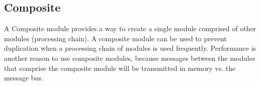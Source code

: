 \par
\subsection{Composite}
A Composite module provides a way to create a single module 
comprised of other modules (processing chain).  A composite module can be used to prevent 
duplication when a processing chain of modules is used frequently.  
Performance is another reason to use composite modules, because messages between the 
modules that comprise the composite module will be transmitted in memory vs. the message 
bus.  

\par
